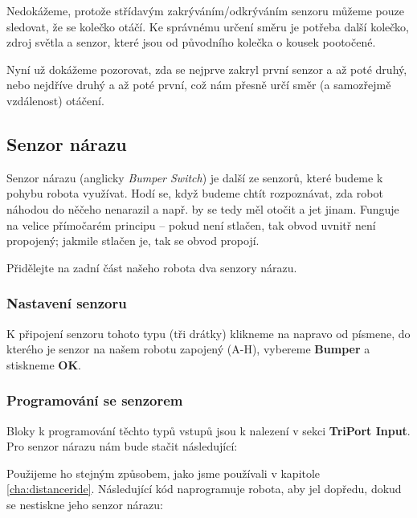 \documentclass[../main.tex]{subfiles}
\begin{document}
	\begin{solution}
		Nedokážeme, protože střídavým zakrýváním/odkrýváním senzoru můžeme pouze sledovat, že se kolečko otáčí. Ke správnému určení směru je potřeba další kolečko, zdroj světla a senzor, které jsou od původního kolečka o kousek pootočené.

		Nyní už dokážeme pozorovat, zda se nejprve zakryl první senzor a až poté druhý, nebo nejdříve druhý a až poté první, což nám přesně určí směr (a samozřejmě vzdálenost) otáčení.
	\end{solution}

	\subsection{Senzor nárazu}
	Senzor nárazu (anglicky \textit{Bumper Switch}) je další ze senzorů, které budeme k pohybu robota využívat. Hodí se, když budeme chtít rozpoznávat, zda robot náhodou do něčeho nenarazil a např. by se tedy měl otočit a jet jinam. Funguje na velice přímočarém principu -- pokud není stlačen, tak obvod uvnitř není propojený; jakmile stlačen je, tak se obvod propojí.

	\begin{question}
		Přidělejte na zadní část našeho robota dva senzory nárazu.
	\end{question}

	\subsubsection{Nastavení senzoru}
	K připojení senzoru tohoto typu (tři drátky) klikneme na  napravo od písmene, do kterého je senzor na našem robotu zapojený (A-H), vybereme \textbf{Bumper} a stiskneme \textbf{OK}.

	\subsubsection{Programování se senzorem}
	Bloky k programování těchto typů vstupů jsou k nalezení v sekci \textbf{TriPort Input}. Pro senzor nárazu nám bude stačit následující:
	\begin{itemize}
		\blockBumperPressed
	\end{itemize}

	Použijeme ho stejným způsobem, jako jsme používali \blockMotorDoneImage v kapitole \ref{cha:distanceride}. Následující kód naprogramuje robota, aby jel dopředu, dokud se nestiskne jeho senzor nárazu:
\end{document}
